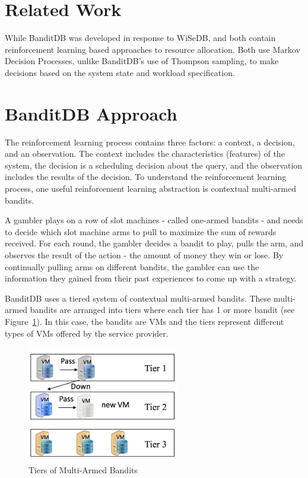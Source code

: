 \documentclass{brandiss}
\numberwithin{section}{chapter}
\numberwithin{figure}{chapter}
\theoremstyle{definition}
\theoremstyle{plain}
\theoremstyle{remark}
\begin{document}
\section{Related Work}

While BanditDB was developed in response to WiSeDB, \cite{barrett2013applying} and \cite{lolos2017elastic} both contain reinforcement learning based approaches to resource allocation. Both use Markov Decision Processes, unlike BanditDB's use of Thompson sampling, to make decisions based on the system state and workload specification.

\section{BanditDB Approach}

The reinforcement learning process contains three factors: a context, a decision, and an observation. The context includes the characteristics (features) of the system, the decision is a scheduling decision about the query, and the observation includes the results of the decision. To understand the reinforcement learning process, one useful reinforcement learning abstraction is contextual multi-armed bandits.

A gambler plays on a row of slot machines - called one-armed bandits - and needs to decide which slot machine arms to pull to maximize the sum of rewards received. For each round, the gambler decides a bandit to play, pulls the arm, and observes the result of the action - the amount of money they win or lose. By continually pulling arms on different bandits, the gambler can use the information they gained from their past experiences to come up with a strategy.

BanditDB uses a tiered system of contextual multi-armed bandits. These multi-armed bandits are arranged into tiers where each tier has 1 or more bandit (see Figure~\ref{fig:bandit}). In this case, the bandits are VMs and the tiers represent different types of VMs offered by the service provider.

\begin{figure}[htbp]
  \centering
  \includegraphics[height=2in]{bandit}
  \caption{Tiers of Multi-Armed Bandits}
  \label{fig:bandit}
\end{figure}
\end{document}
